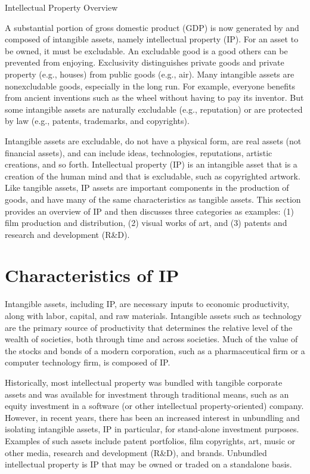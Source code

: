 \documentclass[11pt]{article}
\begin{document}
Intellectual Property Overview

A substantial portion of gross domestic product (GDP) is now generated by and composed of intangible assets, namely intellectual property (IP). For an asset to be owned, it must be excludable. An excludable good is a good others can be prevented from enjoying. Exclusivity distinguishes private goods and private property (e.g., houses) from public goods (e.g., air). Many intangible assets are nonexcludable goods, especially in the long run. For example, everyone benefits from ancient inventions such as the wheel without having to pay its inventor. But some intangible assets are naturally excludable (e.g., reputation) or are protected by law (e.g., patents, trademarks, and copyrights).

Intangible assets are excludable, do not have a physical form, are real assets (not financial assets), and can include ideas, technologies, reputations, artistic creations, and so forth. Intellectual property (IP) is an intangible asset that is a creation of the human mind and that is excludable, such as copyrighted artwork. Like tangible assets, IP assets are important components in the production of goods, and have many of the same characteristics as tangible assets. This section provides an overview of IP and then discusses three categories as examples: (1) film production and distribution, (2) visual works of art, and (3) patents and research and development (R\&D).

\section*{Characteristics of IP}
Intangible assets, including IP, are necessary inputs to economic productivity, along with labor, capital, and raw materials. Intangible assets such as technology are the primary source of productivity that determines the relative level of the wealth of societies, both through time and across societies. Much of the value of the stocks and bonds of a modern corporation, such as a pharmaceutical firm or a computer technology firm, is composed of IP.

Historically, most intellectual property was bundled with tangible corporate assets and was available for investment through traditional means, such as an equity investment in a software (or other intellectual property-oriented) company. However, in recent years, there has been an increased interest in unbundling and isolating intangible assets, IP in particular, for stand-alone investment purposes. Examples of such assets include patent portfolios, film copyrights, art, music or other media, research and development (R\&D), and brands. Unbundled intellectual property is IP that may be owned or traded on a standalone basis.
\end{document}
